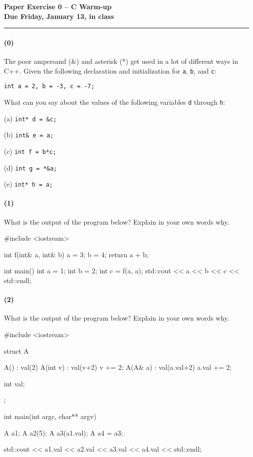 \documentclass[12pt,letterpaper,twoside]{article}
\begin{document}
{\centering \textbf{Paper Exercise 0 -- C Warm-up\\ Due Friday, January 13, in class} \par}
\vspace*{-8pt}\noindent\rule{\linewidth}{1pt}

\paragraph{(0)} The poor ampersand (\&) and asterisk (*) get used in a lot of different ways in C++. Given the following declaration and initialization for {\tt a}, {\tt b}, and {\tt c}:
\begin{verbatim}
int a = 2, b = -3, c = -7;
\end{verbatim}
What can you say about the values of the following variables {\tt d} through {\tt h}:
\begin{compactenum}
\item[(a)] \texttt{int* d = \&c;}
\item[(b)] \texttt{int\& e = a;}
\item[(c)] \texttt{int f = b*c;} 
\item[(d)] \texttt{int g = *\&a;} 
\item[(e)] \texttt{int* h = a;}
\end{compactenum}


\paragraph{(1)} What is the output of the program below? Explain in your own words why.
\begin{cpp}
#include <iostream>

int f(int& a, int& b) {
  a = 3;
  b = 4;
  return a + b;
}

int main() {
  int a = 1;
  int b = 2;
  int c = f(a, a);
  std::cout << a << b << c << std::endl;
}
\end{cpp}


\paragraph{(2)} What is the output of the program below? Explain in your own words why.

\begin{cpp}
#include <iostream>

struct A
{
  A() : val(2) {}
  A(int v) : val(v+2) { v += 2; }
  A(A& a) : val(a.val+2) { a.val += 2; } 

  int val;
};

int main(int argc, char** argv)
{
  A a1;
  A a2(5);
  A a3(a1.val);
  A a4 = a3;
  
  std::cout << a1.val << a2.val << a3.val << a4.val << std::endl;
}
\end{cpp}

\end{document}
